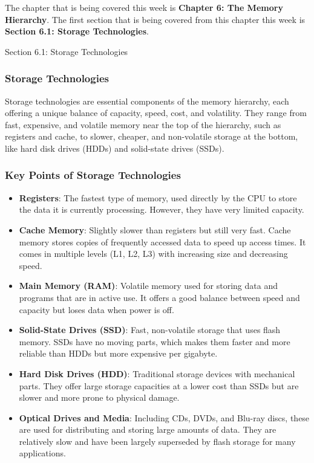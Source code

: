 The chapter that is being covered this week is \textbf{Chapter 6: The Memory Hierarchy}. The first section that is being covered from this chapter this week is \textbf{Section 6.1: Storage Technologies}.

\begin{notes}{Section 6.1: Storage Technologies}
    \subsubsection*{Storage Technologies}

    Storage technologies are essential components of the memory hierarchy, each offering a unique balance of capacity, speed, cost, and volatility. They range from fast, expensive, and volatile memory 
    near the top of the hierarchy, such as registers and cache, to slower, cheaper, and non-volatile storage at the bottom, like hard disk drives (HDDs) and solid-state drives (SSDs).
    
    \vspace*{1em}
    
    \subsubsection*{Key Points of Storage Technologies}
    
    \begin{itemize}
        \item \textbf{Registers}: The fastest type of memory, used directly by the CPU to store the data it is currently processing. However, they have very limited capacity.
        \item \textbf{Cache Memory}: Slightly slower than registers but still very fast. Cache memory stores copies of frequently accessed data to speed up access times. It comes in multiple levels 
        (L1, L2, L3) with increasing size and decreasing speed.
        \item \textbf{Main Memory (RAM)}: Volatile memory used for storing data and programs that are in active use. It offers a good balance between speed and capacity but loses data when power is off.
        \item \textbf{Solid-State Drives (SSD)}: Fast, non-volatile storage that uses flash memory. SSDs have no moving parts, which makes them faster and more reliable than HDDs but more expensive 
        per gigabyte.
        \item \textbf{Hard Disk Drives (HDD)}: Traditional storage devices with mechanical parts. They offer large storage capacities at a lower cost than SSDs but are slower and more prone to physical 
        damage.
        \item \textbf{Optical Drives and Media}: Including CDs, DVDs, and Blu-ray discs, these are used for distributing and storing large amounts of data. They are relatively slow and have been largely 
        superseded by flash storage for many applications.
    \end{itemize}
    

\end{notes}
